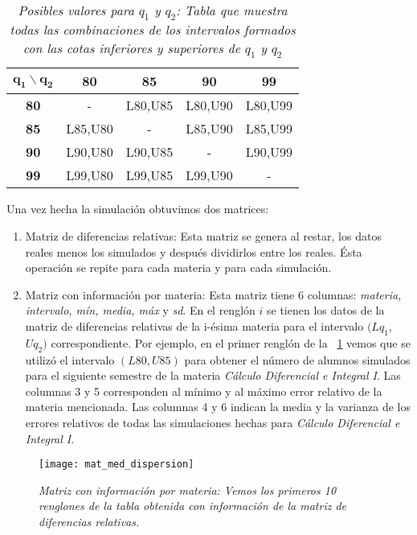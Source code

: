 \begin{table}[H]
\centering
\begin{tabular}{|c|c|c|c|c|}
\hline 
$\textbf{q}_{\textbf{1}} \backslash \textbf{q}_{\textbf{2}}$ & \textbf{80} & \textbf{85} & \textbf{90} & \textbf{99} \\ 
\hline 
\textbf{80} & - & L80,U85 & L80,U90 & L80,U99 \\ 
\hline 
\textbf{85} & L85,U80 & - & L85,U90 & L85,U99 \\ 
\hline 
\textbf{90} & L90,U80 & L90,U85 & - & L90,U99 \\ 
\hline 
\textbf{99} & L99,U80 & L99,U85 & L99,U90 & - \\ 
\hline 
\end{tabular} 
\caption[\textit{Posibles valores para $q_{1}$ y $q_{2}$}]{\textit{Posibles valores para $q_{1}$ y $q_{2}$: Tabla que muestra todas las combinaciones de los intervalos formados con las cotas inferiores y superiores de $q_{1}$ y $q_{2}$}}\label{valoresQ1Q2}
\end{table}


Una vez hecha la simulación obtuvimos dos matrices:

\begin{enumerate}
\item Matriz de diferencias relativas: Esta matriz se genera al restar, los datos reales menos los simulados y después dividirlos entre los reales. Ésta operación se repite para cada materia y para cada simulación.

\item Matriz con información por materia: Esta matriz tiene 6 columnas: \textit{materia, intervalo, mín, media, máx} y \textit{sd}. En el renglón $i$ se tienen los datos de la matriz de diferencias relativas de la i-ésima materia para el intervalo $(Lq_{1}$,$Uq_{2})$ correspondiente. Por ejemplo, en el primer renglón de la \figurename{~\ref{matMedDispersion}} vemos que se utilizó el intervalo $(L80,U85)$ para obtener el número de alumnos simulados para el siguiente semestre de la materia \textit{Cálculo Diferencial e Integral I}. Las columnas 3 y 5 corresponden al mínimo y al máximo error relativo de la materia mencionada. Las columnas 4 y 6 indican la media y la varianza de los errores relativos de todas las simulaciones hechas para \textit{Cálculo Diferencial e Integral I}.
\end{enumerate}



\begin{figure}[H]
\centering
\texttt{[image: mat\_med\_dispersion]} %
\caption[\textit{Matriz con información por materia}]{\textit{Matriz con información por materia: Vemos los primeros 10 renglones de la tabla obtenida con información de la matriz de diferencias relativas.}}\label{matMedDispersion}
\end{figure}


